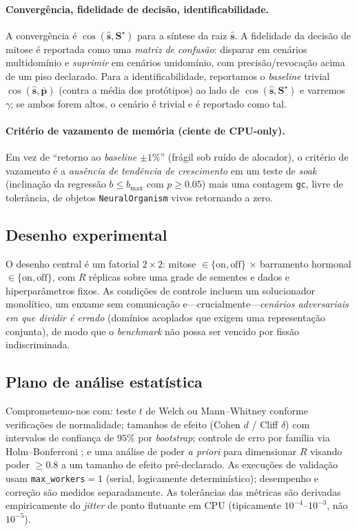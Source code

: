 \documentclass[11pt]{article}
\begin{document}
\paragraph{Convergência, fidelidade de decisão, identificabilidade.}
A convergência é $\cos(\hat{\mathbf{s}}, \mathbf{S}^\star)$ para a síntese da raiz
$\hat{\mathbf{s}}$. A fidelidade da decisão de mitose é reportada como uma
\emph{matriz de confusão}: disparar em cenários multidomínio e \emph{suprimir} em
cenários unidomínio, com precisão/revocação acima de um piso declarado. Para a
identificabilidade, reportamos o \emph{baseline} trivial
$\cos(\hat{\mathbf{s}}, \bar{\mathbf{p}})$ (contra a média dos protótipos) ao lado
de $\cos(\hat{\mathbf{s}}, \mathbf{S}^\star)$ e varremos $\gamma$; se ambos forem
altos, o cenário é trivial e é reportado como tal.

\paragraph{Critério de vazamento de memória (ciente de CPU-only).}
Em vez de ``retorno ao \emph{baseline} $\pm1\%$'' (frágil sob ruído de alocador),
o critério de vazamento é a \emph{ausência de tendência de crescimento} em um teste
de \emph{soak} (inclinação da regressão $b\le b_{\max}$ com $p\ge0.05$) mais uma
contagem \texttt{gc}, livre de tolerância, de objetos \texttt{NeuralOrganism} vivos
retornando a zero.

\subsection{Desenho experimental}
O desenho central é um fatorial $2\times2$: mitose
$\in\{\text{on},\text{off}\}$ $\times$ barramento hormonal
$\in\{\text{on},\text{off}\}$, com $R$ réplicas sobre uma grade de sementes e
dados e hiperparâmetros fixos. As condições de controle incluem um solucionador
monolítico, um enxame sem comunicação e---crucialmente---\emph{cenários
adversariais em que dividir é errado} (domínios acoplados que exigem uma
representação conjunta), de modo que o \emph{benchmark} não possa ser vencido por
fissão indiscriminada.

\subsection{Plano de análise estatística}
Comprometemo-nos com: teste $t$ de Welch ou Mann--Whitney conforme verificações de
normalidade; tamanhos de efeito (Cohen $d$ / Cliff $\delta$) com intervalos de
confiança de $95\%$ por \emph{bootstrap}; controle de erro por família via
Holm--Bonferroni \cite{holm1979bonferroni}; e uma análise de poder \emph{a priori}
para dimensionar $R$ visando poder $\ge0.8$ a um tamanho de efeito pré-declarado.
As execuções de validação usam \texttt{max\_workers}$=1$ (serial, logicamente
determinístico); desempenho e correção são medidos separadamente. As tolerâncias
das métricas são derivadas empiricamente do \emph{jitter} de ponto flutuante em
CPU (tipicamente $10^{-4}$--$10^{-3}$, não $10^{-5}$).
\end{document}
